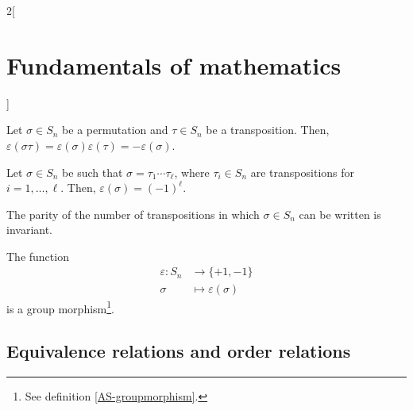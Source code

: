 \documentclass[../../../main.tex]{subfiles}
\begin{document}
\begin{multicols}{2}[\section{Fundamentals of mathematics}]
\begin{theorem}
        Let $\sigma\in S_n$ be a permutation and $\tau\in S_n$ be a transposition. Then, $\varepsilon(\sigma\tau)=\varepsilon(\sigma)\varepsilon(\tau)=-\varepsilon(\sigma)$.
    \end{theorem}
    \begin{corollary}
        Let $\sigma\in S_n$ be such that $\sigma=\tau_1\cdots\tau_\ell$, where $\tau_i\in S_n$ are transpositions for $i=1,\ldots,\ell$. Then, $\varepsilon(\sigma)=(-1)^\ell$.
    \end{corollary}
    \begin{corollary}
        The parity of the number of transpositions in which $\sigma\in S_n$ can be written is invariant.
    \end{corollary}
    \begin{corollary}
        The function
        \begin{align*}
            \varepsilon:S_n&\longrightarrow\{+1,-1\}\\
            \sigma&\longmapsto\varepsilon(\sigma)
        \end{align*}
        is a group morphism\footnote{See definition \ref{AS-groupmorphism}.}.
    \end{corollary}
    \subsection{Equivalence relations and order relations}

\end{multicols}
\end{document}
